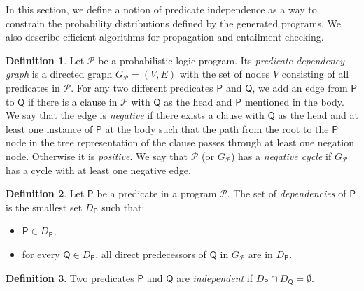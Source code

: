 \documentclass[letterpaper]{article}
\theoremstyle{definition}
\newtheorem{definition}{Definition}
\begin{document}
In this section, we define a notion of predicate independence as a way to
constrain the probability distributions defined by the generated programs. We
also describe efficient algorithms for propagation and entailment checking.

\begin{definition}
  Let $\mathscr{P}$ be a probabilistic logic program. Its \emph{predicate
    dependency graph} is a directed graph $G_{\mathscr{P}} = (V, E)$ with the
  set of nodes $V$ consisting of all predicates in $\mathscr{P}$. For any two
  different predicates $\mathsf{P}$ and $\mathsf{Q}$, we add an edge from
  $\mathsf{P}$ to $\mathsf{Q}$ if there is a clause in $\mathscr{P}$ with
  $\mathsf{Q}$ as the head and $\mathsf{P}$ mentioned in the body. We say that
  the edge is \emph{negative} if there exists a clause with $\mathsf{Q}$ as the
  head and at least one instance of $\mathsf{P}$ at the body such that the path
  from the root to the $\mathsf{P}$ node in the tree representation of the
  clause passes through at least one negation node. Otherwise it is
  \emph{positive}. We say that $\mathscr{P}$ (or $G_{\mathscr{P}}$) has a
  \emph{negative cycle} if $G_{\mathscr{P}}$ has a cycle with at least one
  negative edge.
\end{definition}

\begin{definition}
  Let $\mathsf{P}$ be a predicate in a program $\mathscr{P}$. The set of
  \emph{dependencies} of $\mathsf{P}$ is the smallest set $D_{\mathsf{P}}$ such
  that:
  \begin{itemize}
  \item $\mathsf{P} \in D_{\mathsf{P}}$,
  \item for every $\mathsf{Q} \in D_{\mathsf{P}}$, all direct predecessors of
    $\mathsf{Q}$ in $G_{\mathscr{P}}$ are in $D_{\mathsf{P}}$.
  \end{itemize}
\end{definition}

\begin{definition}
  Two predicates $\mathsf{P}$ and $\mathsf{Q}$ are \emph{independent} if
  $D_{\mathsf{P}} \cap D_{\mathsf{Q}} = \emptyset$.
\end{definition}
\end{document}
